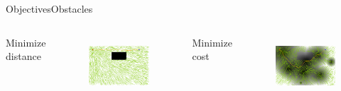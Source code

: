 \begin{frame}{Objectives}{Obstacles}
\begin{columns}
	{ Minimize distance}
	\begin{figure}
		\centering
		\includegraphics[width=\linewidth]{figure/sim5-obstacle/MORRTstar01-1-0.png}
		\label{fig:sim:02:prob1}
	\end{figure}
	{ Minimize cost}
	\begin{figure}
		\centering
		\includegraphics[width=\linewidth]{figure/sim5-obstacle/MORRTstar01-1-1.png}
		\label{fig:sim:02:prob2}
	\end{figure}
\end{columns}
\end{frame}

